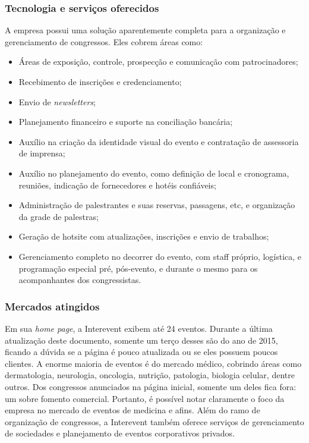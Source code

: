 \documentclass[12pt,a4paper,twoside,hyphens,english,brazil]{abntex2}
\begin{document}
\subsubsection*{Tecnologia e serviços oferecidos}
A empresa possui uma solução aparentemente completa para a organização e gerenciamento de congressos. Eles cobrem áreas como:
\begin{itemize}[itemsep=-1ex]
	\item Áreas de exposição, controle, prospecção e comunicação com patrocinadores;
	\item Recebimento de inscrições e credenciamento;
	\item Envio de \emph{newsletters};
	\item Planejamento financeiro e suporte na conciliação bancária;
	\item Auxílio na criação da identidade visual do evento e contratação de assessoria de imprensa;
	\item Auxílio no planejamento do evento, como definição de local e cronograma, reuniões, indicação de fornecedores e hotéis confiáveis;
	\item Administração de palestrantes e suas reservas, passagens, etc, e organização da grade de palestras;
	\item Geração de hotsite com atualizações, inscrições e envio de trabalhos;
	\item Gerenciamento completo no decorrer do evento, com staff próprio, logística, e programação especial pré, pós-evento, e durante o mesmo para os acompanhantes dos congressistas.
\end{itemize}

\subsubsection*{Mercados atingidos}
Em sua \emph{home page}\cite{interevent}, a Interevent exibem até 24 eventos. Durante a última atualização deste documento, somente um terço desses são do ano de 2015, ficando a dúvida se a página é pouco atualizada ou se eles possuem poucos clientes. A enorme maioria de eventos é do mercado médico, cobrindo áreas como dermatologia, neurologia, oncologia, nutrição, patologia, biologia celular, dentre outros. Dos congressos anunciados na página inicial, somente um deles fica fora: um sobre fomento comercial. Portanto, é possível notar claramente o foco da empresa no mercado de eventos de medicina e afins. Além do ramo de organização de congressos, a Interevent também oferece serviços de gerenciamento de sociedades e planejamento de eventos corporativos privados.
\end{document}
